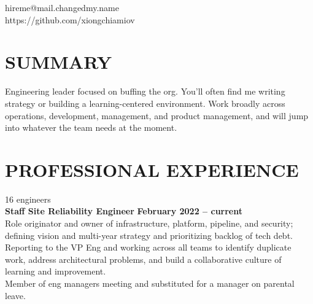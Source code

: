 \documentclass[margin,line]{resume}
\begin{document}
{
    \hfill hireme@mail.changedmy.name       \vspace{0mm}\\\vspace{0mm}%
    \hfill https://github.com/xiongchiamiov \vspace{0mm}\\\vspace{-9mm}%
}

\begin{resume}

    \vspace{-3mm}

    \section{\mysidestyle \textbf{\large{S}\small{UMMARY}}}

    Engineering leader focused on buffing the org.  You'll often find me writing strategy or building a learning-centered environment.  Work broadly across operations, development, management, and product management, and will jump into whatever the team needs at the moment.

    \vspace{-1mm}

\sectionline

    \section{\mysidestyle \textbf{\large{P}\small{ROFESSIONAL} \large{E}\small{XPERIENCE}}}

     \hfill {\selectfont\texttildelow}16 engineers
    \vspace{1mm}\\%
    \textbf{Staff Site Reliability Engineer} \hfill \textbf{February 2022 -- current}\\
    Role originator and owner of infrastructure, platform, pipeline, and security; defining vision and multi-year strategy and prioritizing backlog of tech debt.\\
    Reporting to the VP Eng and working across all teams to identify duplicate work, address architectural problems, and build a collaborative culture of learning and improvement.\\
    Member of eng managers meeting and substituted for a manager on parental leave.


\end{resume}
\end{document}
